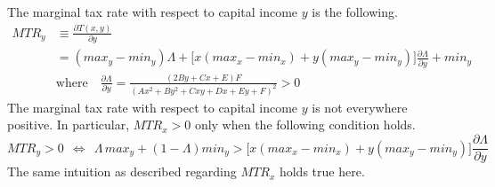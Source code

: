 \documentclass[letterpaper,12pt]{article}
\theoremstyle{definition}
\begin{document}
\begin{spacing}{1.5}
    The marginal tax rate with respect to capital income $y$ is the following.
    \begin{equation}\label{EqMTRy}
      \begin{split}
        MTR_y &\equiv \frac{\partial T(x,y)}{\partial y} \\
        &= (max_y - min_y)\Lambda + \bigl[x(max_x - min_x) + y(max_y - min_y)\bigr]\frac{\partial\Lambda}{\partial y} + min_y \\
        &\text{where}\quad \frac{\partial\Lambda}{\partial y} = \frac{(2By + Cx + E)F}{(Ax^2 + By^2 + Cxy + Dx + Ey + F)^2} > 0
      \end{split}
    \end{equation}
    The marginal tax rate with respect to capital income $y$ is not everywhere positive. In particular, $MTR_x>0$ only when the following condition holds.
    \begin{equation}\label{EqMTRypos}
      MTR_y>0 \:\:\Leftrightarrow\:\: \Lambda\,max_y + (1 - \Lambda)min_y > \bigl[x(max_x - min_x) + y(max_y - min_y)\bigr]\frac{\partial\Lambda}{\partial y}
    \end{equation}
    The same intuition as described regarding $MTR_x$ holds true here.


\end{spacing}
\end{document}
